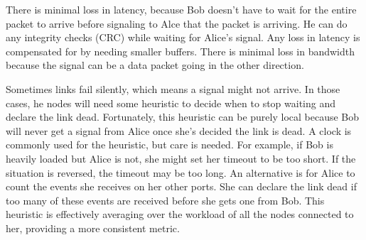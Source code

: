 There is minimal loss in latency, because Bob doesn't have to wait for the entire packet to arrive before signaling to Alce that the packet is arriving.  He can do any integrity checks (CRC) while waiting for Alice's signal.  Any loss in latency is compensated for by needing smaller buffers.  There is minimal loss in bandwidth because the signal can be a data packet going in the other direction.

Sometimes links fail silently, which means a signal might not arrive.  In those cases, he nodes will need some heuristic to decide when to stop waiting and declare the link dead.  Fortunately, this heuristic can be purely local because Bob will never get a signal from Alice once she's decided the link is dead.  A clock is commonly used for the heuristic, but care is needed.  For example, if Bob is heavily loaded but Alice is not, she might set her timeout to be too short.  If the situation is reversed, the timeout may be too long.  An alternative is for Alice to count the events she receives on her other ports.  She can declare the link dead if too many of these events are received before she gets one from Bob.  This heuristic is effectively averaging over the workload of all the nodes connected to her, providing a more consistent metric.





